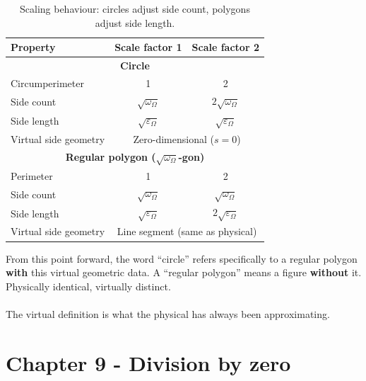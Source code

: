 \documentclass{article}
\begin{document}
\begin{table}[H]
\centering
\begin{tabular}{|l|c|c|}
\hline
\textbf{Property} & \textbf{Scale factor 1} & \textbf{Scale factor 2} \\
\hline
\hline
\multicolumn{3}{|c|}{\textbf{Circle}} \\
\hline
Circumperimeter & 1 & 2 \\
Side count & $\sqrt{\omega_\Omega}$ & $2\sqrt{\omega_\Omega}$ \\
Side length & $\sqrt{\varepsilon_\Omega}$ & $\sqrt{\varepsilon_\Omega}$ \\
Virtual side geometry & \multicolumn{2}{c|}{Zero-dimensional ($s = 0$)} \\
\hline
\hline
\multicolumn{3}{|c|}{\textbf{Regular polygon ($\sqrt{\omega_\Omega}$-gon)}} \\
\hline
Perimeter & 1 & 2 \\
Side count & $\sqrt{\omega_\Omega}$ & $\sqrt{\omega_\Omega}$ \\
Side length & $\sqrt{\varepsilon_\Omega}$ & $2\sqrt{\varepsilon_\Omega}$ \\
Virtual side geometry & \multicolumn{2}{c|}{Line segment (same as physical)} \\
\hline
\end{tabular}
\caption{Scaling behaviour: circles adjust side count, polygons adjust side 
length.}
\label{tab:circle-vs-polygon-scaling}
\end{table}

From this point forward, the word ``circle'' refers specifically to a regular 
polygon \textbf{with} this virtual geometric data. A ``regular polygon'' means 
a figure \textbf{without} it. Physically identical, virtually distinct.\\\\
The virtual definition is what the physical has always been approximating. 

\section{Chapter 9 - Division by zero}
\end{document}
